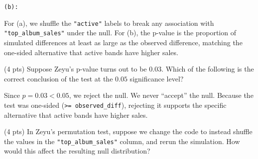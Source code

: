 \documentclass[twoside,12pt]{article}
\begin{document}
\begin{probset}
\begin{prob}[(18 pts)]
\begin{subprobset}
\begin{subprob}
\smallskip
\texttt{(b):} 

\begin{soln}
For (a), we shuffle the \texttt{"active"} labels to break any association with \texttt{"top\_album\_sales"} under the null. For (b), the p-value is the proportion of simulated differences at least as large as the observed difference, matching the one-sided alternative that active bands have higher sales.
\end{soln}

\end{subprob}

\newpage

\begin{subprob}(4 pts)
Suppose Zeyu's p-value turns out to be $0.03$. Which of the following is the correct conclusion of the test at the $0.05$ significance level?

\smallskip
{}

\smallskip
{}

\smallskip
{}

\smallskip
{}



\begin{soln}
Since $p = 0.03 < 0.05$, we reject the null. We never ``accept'' the null. Because the test was one-sided (\texttt{>= observed\_diff}), rejecting it supports the specific alternative that active bands have higher sales.
\end{soln}

\end{subprob}

\bigskip

\begin{subprob}(4 pts)
In Zeyu's permutation test, suppose we change the code to instead shuffle the values in the \texttt{"top\_album\_sales"} column, and rerun the simulation. How would this affect the resulting null distribution?

\smallskip
{}


\end{subprob}
\end{subprobset}
\end{prob}
\end{probset}
\end{document}
